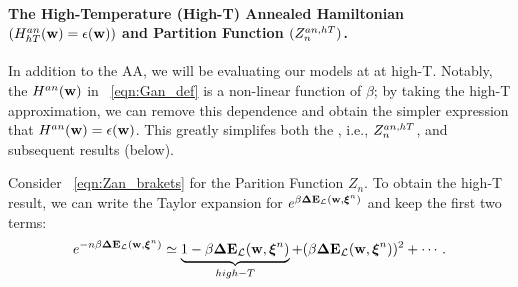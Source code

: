 {\paragraph{The High-Temperature (High-T) Annealed Hamiltonian $(H^{an}_{hT}({\mathbf{w}})=\epsilon({\mathbf{w}}))$ and Partition Function $(Z^{an,hT}_{n})$. }
In addition to the AA, we will be evaluating our models at at high-T.
Notably, the \AnnealedHamiltonian $H^{an}({\mathbf{w}})$ in \EQN~\ref{eqn:Gan_def} is a non-linear function of $\beta$; by
taking the high-T approximation, we can remove this dependence and obtain
the simpler expression that $H^{an}({\mathbf{w}})=\epsilon({\mathbf{w}})$.  This greatly simplifes both
the \PartitionFunction, i.e.,  $Z^{an,hT}_{n}$, and subsequent results (below).


Consider \EQN~\ref{eqn:Zan_brakets} for the Parition Function $Z_{n}$.
To obtain the high-T result, we can write the Taylor expansion for $e^{\beta\mathbf{\Delta {E}}_{\mathcal{L}}(\mathbf{w}, \boldsymbol{\xi}^{n})}$ and keep
the first two terms:
\begin{align}
  e^{-n\beta\mathbf{\Delta {E}}_{\mathcal{L}}(\mathbf{w}, \boldsymbol{\xi}^{n})} \simeq \underbrace{1 - \beta\mathbf{\Delta {E}}_{\mathcal{L}}(\mathbf{w}, \boldsymbol{\xi}^{n})}_{high-T}+ (\beta\mathbf{\Delta {E}}_{\mathcal{L}}(\mathbf{w}, \boldsymbol{\xi}^{n}))^{2} + \cdots  .
\end{align}

}

